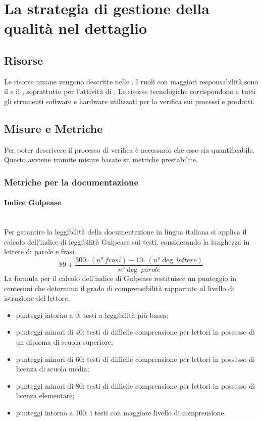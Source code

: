 \section{La strategia di gestione della qualità nel dettaglio}

\subsection{Risorse}
Le risorse umane vengono descritte nelle \NormeDiProgetto. I ruoli con maggiori responsabilità sono il \Responsabile{} e il \Verificatore, soprattutto per l'attività di \VV.
Le risorse tecnologiche corrispondono a tutti gli strumenti software e hardware utilizzati per la verifica sui processi e prodotti.

\subsection{Misure e Metriche}
Per poter descrivere il processo di verifica è necessario che esso sia quantificabile. Questo avviene tramite misure basate su metriche prestabilite.

\subsubsection{Metriche per la documentazione}
\paragraph{Indice Gulpease}\mbox{}\\
Per garantire la leggibilità della documentazione in lingua italiana si applica il calcolo dell'indice di leggibilità Gulpease sui testi, considerando la lunghezza in lettere di parole e frasi.
\[ 89+\frac{300 \cdot \left(n°\ frasi\right)-10 \cdot \left(n°\deg\ lettere\right)}{n°\deg\ parole} \]
La formula per il calcolo dell'indice di Gulpease restituisce un punteggio in centesimi che determina il grado di comprensibilità rapportato al livello di istruzione del lettore.
\begin{itemize}
	\item punteggi intorno a 0: testi a leggibilità più bassa;
	\item punteggi minori di 40: testi di difficile comprensione per lettori in possesso di un diploma di scuola superiore;
	\item punteggi minori di 60: testi di difficile comprensione per lettori in possesso di licenza di scuola media;
	\item punteggi minori di 80: testi di difficile comprensione per lettori in possesso di licenza elementare;
	\item punteggi intorno a 100: i testi con maggiore livello di comprensione.
\end{itemize}

